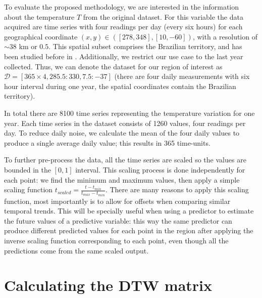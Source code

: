 To evaluate the proposed methodology, we are interested in the information about the temperature $T$ from the original dataset. For this variable the data acquired are time series with four readings per day (every six hours) for each geographical coordinate $(x,y)\in ([278, 348], [10,-60])$, with a resolution of $\sim 38$ km or $0.5$\textdegree. This spatial subset comprises the Brazilian territory, and has been studied before in \cite{Souto2018}. Additionally, we restrict our use case to the last year collected. Thus, we can denote the dataset for our region of interest as $\mathcal{D} = [ 365\times 4, 285.5:330, 7.5:-37]$ (there are four daily measurements with six hour interval during one year, the spatial coordinates contain the Brazilian territory). 

In total there are 8100 time series representing the temperature variation for one year. Each time series in the dataset consists of 1260 values, four readings per day. To reduce daily noise, we calculate the mean of the four daily values to produce a single average daily value; this results in 365 time-units. 

To further pre-process the data, all the time series are scaled so the values are bounded in the $[0, 1]$ interval. This scaling process is done independently for each point: we find the minimum and maximum values, then apply a simple scaling function $ t_{scaled} = \frac{t-t_{min}}{t_{max}-t_{min}}$. There are many reasons to apply this scaling function, most importantly is to allow for offsets when comparing similar temporal trends. This will be specially useful when using a predictor to estimate the future values of a predictive variable: this way the same predictor can produce different predicted values for each point in the region after applying the inverse scaling function corresponding to each point, even though all the predictions come from the same scaled output.

\section{Calculating the DTW matrix}
\label{Sec:Calculating_DTW}

